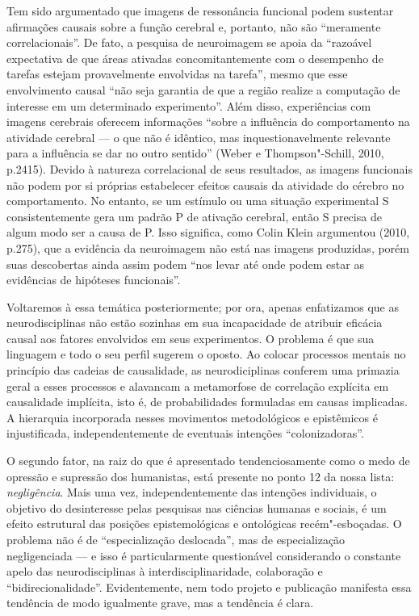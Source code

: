 Tem sido argumentado que imagens de ressonância funcional podem
sustentar afirmações causais sobre a função cerebral e, portanto, não
são ``meramente correlacionais''. De fato, a pesquisa de neuroimagem se
apoia da ``razoável expectativa de que áreas ativadas concomitantemente
com o desempenho de tarefas estejam provavelmente envolvidas na
tarefa'', mesmo que esse envolvimento causal ``não seja garantia de que
a região realize a computação de interesse em um determinado
experimento''. Além disso, experiências com imagens cerebrais oferecem
informações ``sobre a influência do comportamento na atividade cerebral
--- o que não é idêntico, mas inquestionavelmente relevante para a
influência se dar no outro sentido'' (Weber e Thompson"-Schill, 2010,
p.2415). Devido à natureza correlacional de seus resultados, as imagens
funcionais não podem por si próprias estabelecer efeitos causais da
atividade do cérebro no comportamento. No entanto, se um estímulo ou uma
situação experimental S consistentemente gera um padrão P de ativação
cerebral, então S precisa de algum modo ser a causa de P. Isso
significa, como Colin Klein argumentou (2010, p.275), que a evidência da
neuroimagem não está nas imagens produzidas, porém suas descobertas
ainda assim podem ``nos levar até onde podem estar as evidências de
hipóteses funcionais''.

Voltaremos à essa temática posteriormente; por ora, apenas enfatizamos
que as neurodisciplinas não estão sozinhas em sua incapacidade de
atribuir eficácia causal aos fatores envolvidos em seus experimentos. O
problema é que sua linguagem e todo o seu perfil sugerem o oposto. Ao
colocar processos mentais no princípio das cadeias de causalidade, as
neurodiciplinas conferem uma primazia geral a esses processos e
alavancam a metamorfose de correlação explícita em causalidade
implícita, isto é, de probabilidades formuladas em causas implicadas. A
hierarquia incorporada nesses movimentos metodológicos e epistêmicos é
injustificada, independentemente de eventuais intenções
``colonizadoras''.

O segundo fator, na raiz do que é apresentado tendenciosamente como o
medo de opressão e supressão dos humanistas, está presente no ponto 12
da nossa lista: \emph{negligência}. Mais uma vez, independentemente das
intenções individuais, o objetivo do desinteresse pelas pesquisas nas
ciências humanas e sociais, é um efeito estrutural das posições
epistemológicas e ontológicas recém"-esboçadas. O problema não é de
``especialização deslocada'', mas de especialização negligenciada --- e
isso é particularmente questionável considerando o constante apelo das
neurodisciplinas à interdisciplinaridade, colaboração e
``bidirecionalidade''. Evidentemente, nem todo projeto e publicação
manifesta essa tendência de modo igualmente grave, mas a tendência é
clara.


